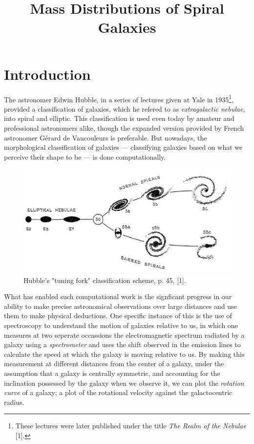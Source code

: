 \documentclass{article}
\title{Mass Distributions of Spiral Galaxies}
\date{}
\begin{document}
\maketitle

\section{Introduction}\label{sec:introduction}

The astronomer Edwin Hubble, in a series of lectures given at Yale in 1935\footnote{These lectures were later published under the title \textit{The Realm of the Nebulae} [1].}, provided a classification of galaxies, which he refered to as \textit{extragalactic nebulae}, into spiral and elliptic.
This classification is used even today by amateur and professional astronomers alike, though the expanded version provided by French astronomer Gérard de Vaucouleurs is preferable.
But nowadays, the morphological classification of galaxies --- classifying galaxies based on what we perceive their shape to be --- is done computationally.

\begin{figure}[h!]
    \centering
    \includegraphics[width=0.7\linewidth]{hubblefork}
    \caption{Hubble's "tuning fork" classification scheme, p. 45, [1].}
    \label{fig:hubblefork}
\end{figure}

What has enabled such computational work is the signficant progress in our ability to make precise astronomical observations over large distances and use them to make physical deductions.
One specific instance of this is the use of spectroscopy to understand the motion of galaxies relative to us, in which one measures at two seperate occassions the electromagnetic spectrum radiated by a galaxy using a \textit{spectrometer} and uses the shift observed in the emission lines to calculate the speed at which the galaxy is moving relative to us.
By making this measurement at different distances from the center of a galaxy, under the assumption that a galaxy is centrally symmetric, and accounting for the inclination possessed by the galaxy when we observe it, we can plot the \textit{rotation curve} of a galaxy; a plot of the rotational velocity against the galactocentric radius.
\end{document}

